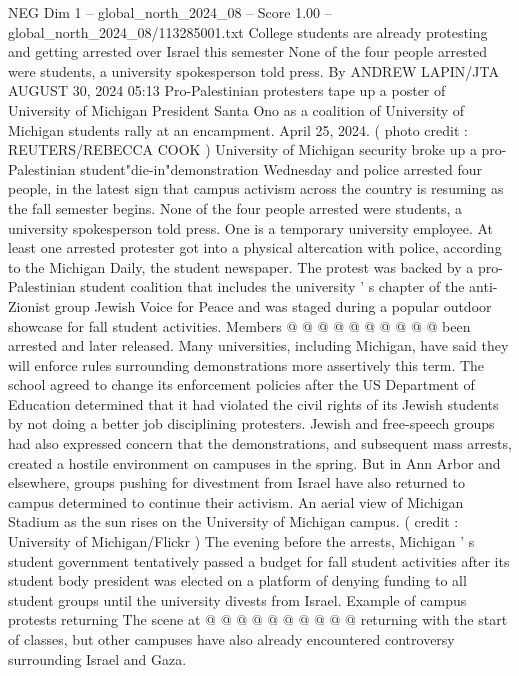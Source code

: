 \begin{textsample}{NEG Dim 1 – global\_north\_2024\_08 – Score 1.00 – global\_north\_2024\_08/113285001.txt}  \label{ex:f1_neg_045}
College students are already protesting and getting arrested over Israel this semester None of the four people arrested were students, a university spokesperson told press.
By ANDREW LAPIN/JTA AUGUST 30, 2024 05:13 Pro-Palestinian protesters tape up a poster of University of Michigan President Santa Ono as a coalition of University of Michigan students rally at an encampment.
April 25, 2024. ( photo credit : REUTERS/REBECCA COOK ) University of Michigan security broke up a pro-Palestinian student"die-in"demonstration Wednesday and police arrested four people, in the latest sign that campus activism across the country is resuming as the fall semester begins.
None of the four people arrested were students, a university spokesperson told press.
One is a temporary university employee.
At least one arrested protester got into a physical altercation with police, according to the Michigan Daily, the student newspaper.
The protest was backed by a pro-Palestinian student coalition that includes the university ' s chapter of the anti-Zionist group Jewish Voice for Peace and was staged during a popular outdoor showcase for fall student activities.
Members @ @ @ @ @ @ @ @ @ @ been arrested and later released.
Many universities, including Michigan, have said they will enforce rules surrounding demonstrations more assertively this term.
The school agreed to change its enforcement policies after the US Department of Education determined that it had violated the civil rights of its Jewish students by not doing a better job disciplining protesters.
Jewish and free-speech groups had also expressed concern that the demonstrations, and subsequent mass arrests, created a hostile environment on campuses in the spring.
But in Ann Arbor and elsewhere, groups pushing for divestment from Israel have also returned to campus determined to continue their activism.
An aerial view of Michigan Stadium as the sun rises on the University of Michigan campus. ( credit : University of Michigan/Flickr ) The evening before the arrests, Michigan ' s student government tentatively passed a budget for fall student activities after its student body president was elected on a platform of denying funding to all student groups until the university divests from Israel.
Example of campus protests returning The scene at @ @ @ @ @ @ @ @ @ @ returning with the start of classes, but other campuses have also already encountered controversy surrounding Israel and Gaza.

\end{textsample}
